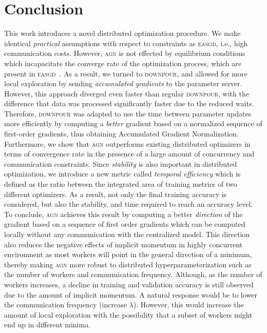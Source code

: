 \documentclass[wcp]{jmlr}
\begin{document}
\section{Conclusion}
\label{sec:conclusion}

This work introduces a novel distributed optimization procedure. We make identical \emph{practical} assumptions with respect to constraints as \textsc{easgd}, i.e., high communication costs. However, \textsc{agn} is not effected by equilibrium conditions which incapacitate the converge rate of the optimization process, which are present in \textsc{easgd}~\cite{Hermans:2276711}. As a result, we turned to \textsc{downpour}, and allowed for more local exploration by sending \emph{accumulated gradients} to the parameter server. However, this approach diverged even faster than regular \textsc{downpour}, with the difference that data was processed significantly faster due to the reduced waits.\\

Therefore, \textsc{downpour} was adapted to use the time between parameter updates more efficiently by computing a \emph{better} gradient based on a normalized sequence of first-order gradients, thus obtaining Accumulated Gradient Normalization. Furthermore, we show that \textsc{agn} outperforms existing distributed optimizers in terms of convergence rate in the presence of a large amount of concurrency and communication constraints. Since \emph{stability} is also important in distributed optimization, we introduce a new metric called \emph{temporal efficiency} which is defined as the ratio between the integrated area of training metrics of two different optimizers. As a result, not only the final training accuracy is considered, but also the stability, and time required to reach an accuracy level.\\

To conclude, \textsc{agn} achieves this result by computing a better \emph{direction} of the gradient based on a sequence of first order gradients which can be computed locally without any communication with the centralized model. This direction also reduces the negative effects of implicit momentum in highly concurrent environment as most workers will point in the general direction of a minimum, thereby making \textsc{agn} more robust to distributed hyperparameterization such as the number of workers and communication frequency. Although, as the number of workers increases, a decline in training and validation accuracy is still observed due to the amount of implicit momentum. A natural response would be to lower the communication frequency (increase $\lambda$). However, this would increase the amount of local exploration with the possibility that a subset of workers might end up in different minima.\\
\end{document}
